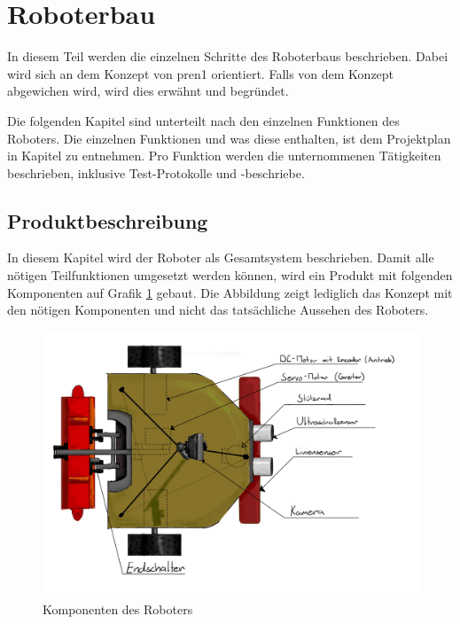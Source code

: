 \section{Roboterbau}

In diesem Teil werden die einzelnen Schritte des Roboterbaus beschrieben. Dabei wird sich an dem Konzept von \acrshort{pren1} orientiert. Falls von dem Konzept abgewichen wird, wird dies erwähnt und begründet.

Die folgenden Kapitel sind unterteilt nach den einzelnen Funktionen des Roboters. Die einzelnen Funktionen und was diese enthalten, ist dem Projektplan in Kapitel  zu entnehmen. Pro Funktion werden die unternommenen Tätigkeiten beschrieben, inklusive Test-Protokolle und -beschriebe.

\subsection{Produktbeschreibung}

In diesem Kapitel wird der Roboter als Gesamtsystem beschrieben.
Damit alle nötigen Teilfunktionen umgesetzt werden können, wird ein Produkt mit folgenden Komponenten auf Grafik \ref{fig:components} gebaut. Die Abbildung zeigt lediglich das Konzept mit den nötigen Komponenten und nicht das tatsächliche Aussehen des Roboters.


\begin{figure}[H]
\centering
\includegraphics[width=\textwidth]{assets/gesamtkonzept/Skizze-Fahrzeugkonzept-Beschriftet.jpg}
\caption{Komponenten des Roboters}
\label{fig:components}
\end{figure}

